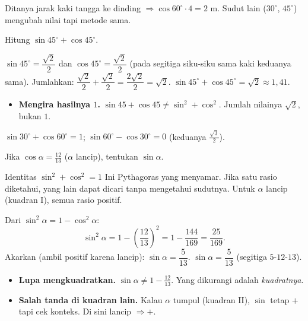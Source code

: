 \begin{variasi}
Ditanya jarak kaki tangga ke dinding $\Rightarrow \cos60^\circ\cdot4=2$ m.
Sudut lain ($30^\circ$, $45^\circ$) mengubah nilai tapi metode sama.
\end{variasi}

\begin{soalbox}{}
Hitung $\sin45^\circ+\cos45^\circ$.
\end{soalbox}

\jawab
{} $\sin45^\circ=\dfrac{\sqrt2}{2}$ dan $\cos45^\circ=\dfrac{\sqrt2}{2}$
(pada segitiga siku-siku sama kaki keduanya sama).
 Jumlahkan: $\dfrac{\sqrt2}{2}+\dfrac{\sqrt2}{2}=\dfrac{2\sqrt2}{2}
=\sqrt2$.
\jadi $\sin45^\circ+\cos45^\circ=\sqrt2\approx1{,}41$.

\begin{jebakan}
\begin{itemize}[leftmargin=*,topsep=2pt]
  \item \textbf{Mengira hasilnya $1$.} $\sin45+\cos45\neq\sin^2+\cos^2$.
  Jumlah nilainya $\sqrt2$, bukan $1$.
\end{itemize}
\end{jebakan}

\begin{variasi}
$\sin30^\circ+\cos60^\circ=1$; $\sin60^\circ-\cos30^\circ=0$ (keduanya
$\frac{\sqrt3}{2}$).
\end{variasi}

\begin{soalbox}{}
Jika $\cos\alpha=\tfrac{12}{13}$ ($\alpha$ lancip), tentukan $\sin\alpha$.
\end{soalbox}

\begin{ingat}{Identitas $\sin^2+\cos^2=1$}
Ini Pythagoras yang menyamar. Jika satu rasio diketahui, yang lain dapat dicari
tanpa mengetahui sudutnya. Untuk $\alpha$ lancip (kuadran I), semua rasio positif.
\end{ingat}

\jawab
{} Dari $\sin^2\alpha=1-\cos^2\alpha$:
\[
\sin^2\alpha=1-\left(\frac{12}{13}\right)^2=1-\frac{144}{169}=\frac{25}{169}.
\]
 Akarkan (ambil positif karena lancip):
$\sin\alpha=\dfrac{5}{13}$.
\jadi $\sin\alpha=\dfrac{5}{13}$ (segitiga $5$-$12$-$13$).

\begin{jebakan}
\begin{itemize}[leftmargin=*,topsep=2pt]
  \item \textbf{Lupa mengkuadratkan.} $\sin\alpha\neq1-\frac{12}{13}$. Yang
  dikurangi adalah \emph{kuadratnya}.
  \item \textbf{Salah tanda di kuadran lain.} Kalau $\alpha$ tumpul (kuadran II),
  $\sin$ tetap $+$ tapi cek konteks. Di sini lancip $\Rightarrow +$.
\end{itemize}
\end{jebakan}

